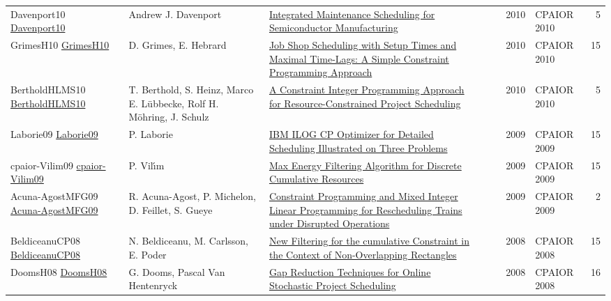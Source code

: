 {\begin{longtable}{p{3cm}p{6cm}p{7cm}rrrp{3cm}r}
Davenport10 \href{https://doi.org/10.1007/978-3-642-13520-0\_12}{Davenport10} & Andrew J. Davenport & \href{papers/Davenport10.pdf}{Integrated Maintenance Scheduling for Semiconductor Manufacturing} &  & \cite{Davenport10} & 2010 & CPAIOR 2010 & 5\\
GrimesH10 \href{https://doi.org/10.1007/978-3-642-13520-0\_19}{GrimesH10} & D. Grimes, E. Hebrard & \href{papers/GrimesH10.pdf}{Job Shop Scheduling with Setup Times and Maximal Time-Lags: {A} Simple Constraint Programming Approach} &  & \cite{GrimesH10} & 2010 & CPAIOR 2010 & 15\\
BertholdHLMS10 \href{https://doi.org/10.1007/978-3-642-13520-0\_34}{BertholdHLMS10} & T. Berthold, S. Heinz, Marco E. L{\"{u}}bbecke, Rolf H. M{\"{o}}hring, J. Schulz & \href{papers/BertholdHLMS10.pdf}{A Constraint Integer Programming Approach for Resource-Constrained Project Scheduling} &  & \cite{BertholdHLMS10} & 2010 & CPAIOR 2010 & 5\\
Laborie09 \href{https://doi.org/10.1007/978-3-642-01929-6\_12}{Laborie09} & P. Laborie & \href{papers/Laborie09.pdf}{{IBM} {ILOG} {CP} Optimizer for Detailed Scheduling Illustrated on Three Problems} &  & \cite{Laborie09} & 2009 & CPAIOR 2009 & 15\\
cpaior-Vilim09 \href{https://doi.org/10.1007/978-3-642-01929-6\_22}{cpaior-Vilim09} & P. Vil{\'{\i}}m & \href{papers/cpaior-Vilim09.pdf}{Max Energy Filtering Algorithm for Discrete Cumulative Resources} &  & \cite{cpaior-Vilim09} & 2009 & CPAIOR 2009 & 15\\
Acuna-AgostMFG09 \href{https://doi.org/10.1007/978-3-642-01929-6\_24}{Acuna-AgostMFG09} & R. Acuna{-}Agost, P. Michelon, D. Feillet, S. Gueye & \href{papers/Acuna-AgostMFG09.pdf}{Constraint Programming and Mixed Integer Linear Programming for Rescheduling Trains under Disrupted Operations} &  & \cite{Acuna-AgostMFG09} & 2009 & CPAIOR 2009 & 2\\
BeldiceanuCP08 \href{https://doi.org/10.1007/978-3-540-68155-7\_5}{BeldiceanuCP08} & N. Beldiceanu, M. Carlsson, E. Poder & \href{papers/BeldiceanuCP08.pdf}{New Filtering for the cumulative Constraint in the Context of Non-Overlapping Rectangles} &  & \cite{BeldiceanuCP08} & 2008 & CPAIOR 2008 & 15\\
DoomsH08 \href{https://doi.org/10.1007/978-3-540-68155-7\_8}{DoomsH08} & G. Dooms, Pascal Van Hentenryck & \href{papers/DoomsH08.pdf}{Gap Reduction Techniques for Online Stochastic Project Scheduling} &  & \cite{DoomsH08} & 2008 & CPAIOR 2008 & 16\\

\end{longtable}}
